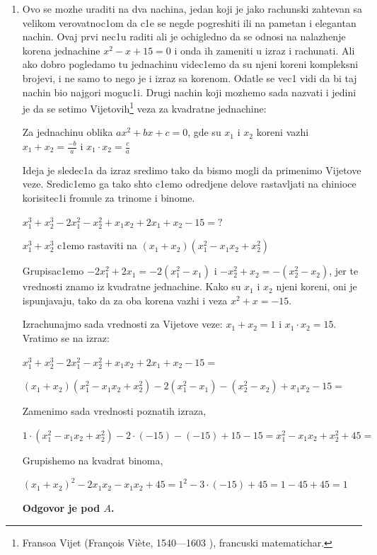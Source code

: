 \documentclass[a4paper,12pt]{article}
\newcommand{\Lat}{\fontencoding{OT1}\selectfont}
\begin{document}
\begin{enumerate}[1.]
\item Ovo se mozhe uraditi na dva nachina, jedan koji je jako rachunski zahtevan sa velikom verovatnoc1om da c1e se negde pogreshiti ili na pametan i elegantan nachin. Ovaj prvi nec1u raditi ali je ochigledno da se odnosi na nalazhenje korena jednachine $x^2 - x + 15 = 0$ i onda ih zameniti u izraz i rachunati. Ali ako dobro pogledamo tu jednachinu videc1emo da su njeni koreni kompleksni brojevi, i ne samo to nego je i izraz sa korenom. Odatle se vec1 vidi da bi taj nachin bio najgori moguc1i. Drugi nachin koji mozhemo sada nazvati i jedini je da se setimo Vijetovih\footnote{ Fransoa Vijet ({\Lat Fran\c{c}ois Vi\`{e}te, 1540---1603 }), francuski matematichar.} veza za kvadratne jednachine:
\par Za jednachinu oblika $ax^2 + bx + c = 0$, gde su $x_1$ i $x_2$ koreni vazhi $x_1 + x_2 = \frac{-b}{a}$ i $x_1 \cdot x_2 = \frac{c}{a}$
\par Ideja je sledec1a da izraz sredimo tako da bismo mogli da primenimo Vijetove veze. Sredic1emo ga tako shto c1emo odredjene delove rastavljati na chinioce korisitec1i fromule za trinome i binome.
\par $x_1^3 + x_2^3 - 2x_1^2 - x_2^2 + x_1x_2 + 2x_1 + x_2 -15 = ?$
\par $x_1^3 + x_2^3$ c1emo rastaviti na $(x_1 + x_2)(x_1^2 -x_1x_2 + x_2^2 )$
\par Grupisac1emo $-2x_1^2 +2x_1 = -2(x_1^2 -x_1)$ i $-x_2^2 +x_2 = - (x_2^2 -x_2)$, jer te vrednosti znamo iz kvadratne jednachine. Kako su $x_1$ i $x_2$ njeni koreni, oni je ispunjavaju, tako da za oba korena vazhi i veza $x^2 + x = -15$.
\par Izrachunajmo sada vrednosti za Vijetove veze: $x_1 + x_2 = 1$ i $x_1 \cdot x_2 = 15$. Vratimo se na izraz:
\par $x_1^3 + x_2^3 - 2x_1^2 - x_2^2 + x_1x_2 + 2x_1 + x_2 -15 = $
\par $(x_1 + x_2)(x_1^2 -x_1x_2 + x_2^2 ) -2(x_1^2 -x_1) - (x_2^2 -x_2) +x_1x_2 - 15=  $
\par Zamenimo sada vrednosti poznatih izraza,
\par $ 1 \cdot(x_1^2 -x_1x_2 + x_2^2 ) -2 \cdot(-15) - (-15) +15 - 15 = x_1^2 -x_1x_2 + x_2^2 + 45 = $
\par Grupishemo na kvadrat binoma,
\par $(x_1 + x_2)^2 - 2x_1x_2 - x_1x_2 + 45 = 1^2 -3 \cdot (-15) + 45 = 1 - 45 + 45 = 1$
\par \textbf{Odgovor je pod $A$.}


\end{enumerate}
\end{document}
